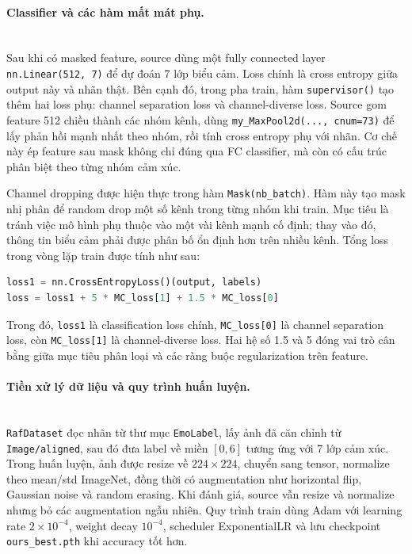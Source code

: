 \paragraph{Classifier và các hàm mất mát phụ.}\mbox{}\\
Sau khi có masked feature, source dùng một fully connected layer \texttt{nn.Linear(512, 7)} để dự đoán 7 lớp biểu cảm. Loss chính là cross entropy giữa output này và nhãn thật. Bên cạnh đó, trong pha train, hàm \texttt{supervisor()} tạo thêm hai loss phụ: channel separation loss và channel-diverse loss. Source gom feature 512 chiều thành các nhóm kênh, dùng \texttt{my\_MaxPool2d(..., cnum=73)} để lấy phản hồi mạnh nhất theo nhóm, rồi tính cross entropy phụ với nhãn. Cơ chế này ép feature sau mask không chỉ đúng qua FC classifier, mà còn có cấu trúc phân biệt theo từng nhóm cảm xúc.

Channel dropping được hiện thực trong hàm \texttt{Mask(nb\_batch)}. Hàm này tạo mask nhị phân để random drop một số kênh trong từng nhóm khi train. Mục tiêu là tránh việc mô hình phụ thuộc vào một vài kênh mạnh cố định; thay vào đó, thông tin biểu cảm phải được phân bố ổn định hơn trên nhiều kênh. Tổng loss trong vòng lặp train được tính như sau:
\begin{lstlisting}[language=Python]
loss1 = nn.CrossEntropyLoss()(output, labels)
loss = loss1 + 5 * MC_loss[1] + 1.5 * MC_loss[0]
\end{lstlisting}
Trong đó, \texttt{loss1} là classification loss chính, \texttt{MC\_loss[0]} là channel separation loss, còn \texttt{MC\_loss[1]} là channel-diverse loss. Hai hệ số 1.5 và 5 đóng vai trò cân bằng giữa mục tiêu phân loại và các ràng buộc regularization trên feature.

\paragraph{Tiền xử lý dữ liệu và quy trình huấn luyện.}\mbox{}\\
\texttt{RafDataset} đọc nhãn từ thư mục \texttt{EmoLabel}, lấy ảnh đã căn chỉnh từ \texttt{Image/aligned}, sau đó đưa label về miền \([0,6]\) tương ứng với 7 lớp cảm xúc. Trong huấn luyện, ảnh được resize về \(224 \times 224\), chuyển sang tensor, normalize theo mean/std ImageNet, đồng thời có augmentation như horizontal flip, Gaussian noise và random erasing. Khi đánh giá, source vẫn resize và normalize nhưng bỏ các augmentation ngẫu nhiên. Quy trình train dùng Adam với learning rate \(2 \times 10^{-4}\), weight decay \(10^{-4}\), scheduler ExponentialLR và lưu checkpoint \texttt{ours\_best.pth} khi accuracy tốt hơn.

